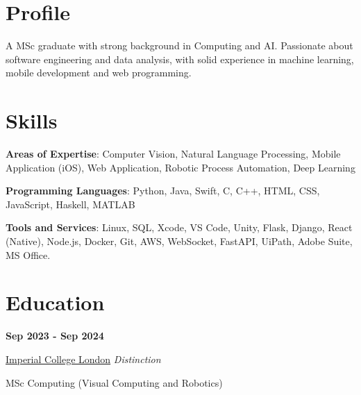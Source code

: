 \documentclass[9pt,a4paper]{article} %
\begin{document}
\begin{multicols}{2}
\section{Profile}
A MSc graduate with strong background in Computing and AI. Passionate about software engineering and data analysis, with solid experience in machine learning, mobile development and web programming.


\section{Skills}

\textbf{Areas of Expertise}: Computer Vision, Natural Language Processing, Mobile Application (iOS), Web Application, Robotic Process Automation, Deep Learning
\vspace{2mm}

\textbf{Programming Languages}: Python, Java, Swift, C, C++, HTML, CSS, JavaScript, Haskell, MATLAB
\vspace{2mm}

\textbf{Tools and Services}: Linux, SQL, Xcode, VS Code, Unity, Flask, Django, React (Native), Node.js, Docker, Git, AWS, WebSocket, FastAPI, UiPath, Adobe Suite, MS Office.


\section{Education}

\textbf{Sep 2023 - Sep 2024}

\href{https://www.imperial.ac.uk}{Imperial College London} \hfill \textit{Distinction}

MSc Computing (Visual Computing and Robotics)
\vspace{2mm}


\end{multicols}
\end{document}
